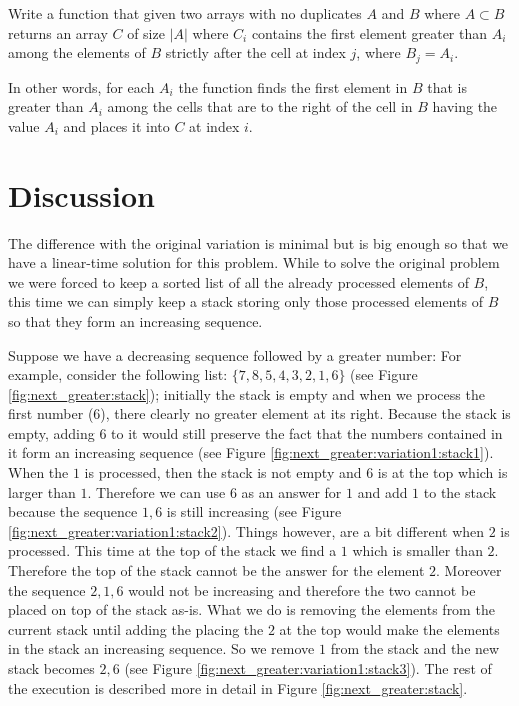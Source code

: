 \begin{exercise}
	\label{example:next_greater_element:exercice2}
	Write a function that given two arrays with no duplicates $A$ and $B$ where $A \subset B$
	returns an array $C$ of size $|A|$ where $C_i$ contains the first element greater than $A_i$
	among the elements of $B$ strictly after the cell at index $j$, where $B_j = A_i$.
	
	In other words, for each $A_i$ the function finds the first element in $B$ that is greater than
	$A_i$ among the cells that are to the right of the cell in $B$ having the value $A_i$ and places
	it into $C$ at index $i$.

\end{exercise}

\section{Discussion}
\label{next_greater_element:sec:variation1:discussion}
The difference with the original variation is minimal but is big enough so that we have a
linear-time solution for this problem. While to solve the original problem  we were forced to keep a
sorted list of all the already processed elements of $B$, this time we can simply keep a stack
storing only those processed elements of $B$ so that they form an increasing sequence.

Suppose we have a decreasing sequence followed by a greater number: For example, consider the
following list: $\{7,8,5, 4, 3, 2, 1, 6\}$ (see Figure \ref{fig:next_greater:stack});
initially the stack is empty and when we process the
first number ($6$), there clearly no greater element at its right. Because the stack is empty,
adding $6$ to it would still preserve the fact that the numbers contained in it form an increasing
sequence (see Figure \ref{fig:next_greater:variation1:stack1}).
When the $1$ is processed, then the stack is not empty and $6$ is at the top which is larger
than $1$. Therefore we can use $6$ as an answer for $1$ and add $1$ to the stack because the
sequence $1,6$ is still increasing (see Figure \ref{fig:next_greater:variation1:stack2}). Things however, are a bit different when $2$ is processed. This
time at the top of the stack we find a $1$ which is smaller  than $2$. Therefore the top of the
stack cannot be the answer for the element $2$. Moreover the sequence $2,1,6$ would not be
increasing and therefore the two cannot be placed on top of the stack as-is. What we do is removing
the elements from the current stack until adding the placing the $2$ at the top
would make the elements in the stack an
increasing sequence. 
So we remove $1$ from the stack and the new stack becomes 
$2,6$ (see Figure \ref{fig:next_greater:variation1:stack3}). 
The rest of the execution is described more in detail in Figure \ref{fig:next_greater:stack}.


